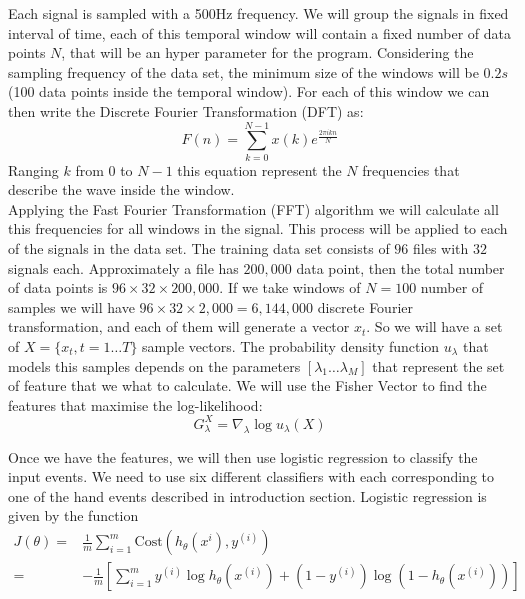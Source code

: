\documentclass[]{article}
\begin{document}
Each signal is sampled with a 500Hz frequency. We will group the signals in fixed interval of time, each of this temporal window will contain a fixed number of data points $N$, that will be an hyper parameter for the program. Considering the sampling frequency of the data set, the minimum size of the windows will be $0.2 s$ (100 data points inside the temporal window). 
For each of this window we can then write the Discrete Fourier Transformation (DFT) as:
\begin{equation}
  \label{DFT}
  F(n) =\sum_{k=0}^{N-1}x(k)e^{\frac{2\pi i kn}{N}}
\end{equation}  
Ranging $k$ from $0$ to $N-1$ this equation represent the $N$ frequencies that describe the wave inside the window.\\
Applying the Fast Fourier Transformation (FFT) algorithm\cite{FFT} we will calculate all this frequencies for all windows in the signal. This process will be applied to each of the signals in the data set. The training data set consists of $96$ files with $32$ signals each. Approximately a file has $200,000$ data point, then the total number of data points is $96\times 32 \times 200,000$. If we take windows of $N=100$ number of samples we will have $96\times 32 \times 2,000=6,144,000$ discrete Fourier transformation, and each of them will generate a vector $x_t$. So we will have a set of $X=\{x_t,t=1\dots T\}$ sample vectors. The probability density function  $u_\lambda$  that models this samples
depends on the parameters $[\lambda_1\dots \lambda_M]$ that represent the set of feature that we what to calculate. We will use the Fisher Vector\cite{fisher} to find the features that maximise the log-likelihood:
\begin{equation}\label{loglikelihood}
G_\lambda^X= \nabla_\lambda \log u_\lambda(X)
\end{equation}



Once we have the features, we will then use logistic regression to classify the input events.  We need to use six different classifiers with each corresponding to one of the hand events described in introduction section.  Logistic regression is given by the function
\begin{align*}
  J(\theta) = & \frac{1}{m} \sum_{i = 1}^{m} \mathrm{Cost}(h_{\theta}(x^{i}), y^{(i)}) \\
  = & -\frac{1}{m} [\sum_{i=1}^{m} y^{(i)} \log{h_{\theta}(x^{(i)} )} + (1 - y^{(i)}) \log{( 1 - h_{\theta}(x^{(i)}) )}]
\end{align*}
\end{document}
